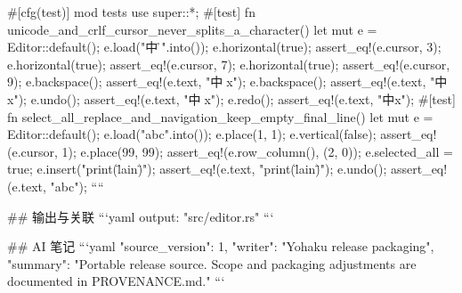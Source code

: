 #[cfg(test)]
mod tests {
    use super::*;
    #[test]
    fn unicode_and_crlf_cursor_never_splits_a_character() {
        let mut e = Editor::default();
        e.load("中🧸\r\nx".into());
        e.horizontal(true);
        assert_eq!(e.cursor, 3);
        e.horizontal(true);
        assert_eq!(e.cursor, 7);
        e.horizontal(true);
        assert_eq!(e.cursor, 9);
        e.backspace();
        assert_eq!(e.text, "中🧸x");
        e.backspace();
        assert_eq!(e.text, "中x");
        e.undo();
        assert_eq!(e.text, "中🧸x");
        e.redo();
        assert_eq!(e.text, "中x");
    }
    #[test]
    fn select_all_replace_and_navigation_keep_empty_final_line() {
        let mut e = Editor::default();
        e.load("abc\n".into());
        e.place(1, 1);
        e.vertical(false);
        assert_eq!(e.cursor, 1);
        e.place(99, 99);
        assert_eq!(e.row_column(), (2, 0));
        e.selected_all = true;
        e.insert("print(\"lain\")");
        assert_eq!(e.text, "print(\"lain\")");
        e.undo();
        assert_eq!(e.text, "abc\n");
    }
}
````

## 输出与关联
```yaml
output: "src/editor.rs"
```

## AI 笔记
```yaml
{"source_version": 1, "writer": "Yohaku release packaging", "summary": "Portable release source. Scope and packaging adjustments are documented in PROVENANCE.md."}
```
